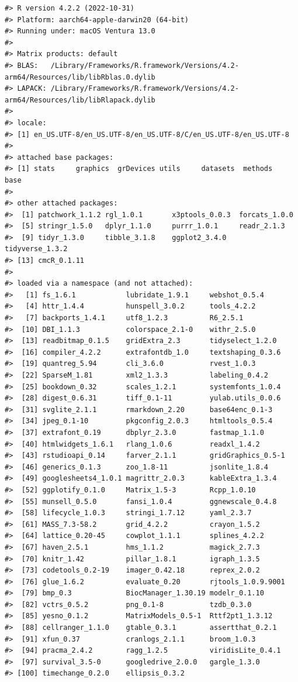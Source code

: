 \begin{verbatim}
#> R version 4.2.2 (2022-10-31)
#> Platform: aarch64-apple-darwin20 (64-bit)
#> Running under: macOS Ventura 13.0
#> 
#> Matrix products: default
#> BLAS:   /Library/Frameworks/R.framework/Versions/4.2-arm64/Resources/lib/libRblas.0.dylib
#> LAPACK: /Library/Frameworks/R.framework/Versions/4.2-arm64/Resources/lib/libRlapack.dylib
#> 
#> locale:
#> [1] en_US.UTF-8/en_US.UTF-8/en_US.UTF-8/C/en_US.UTF-8/en_US.UTF-8
#> 
#> attached base packages:
#> [1] stats     graphics  grDevices utils     datasets  methods   base     
#> 
#> other attached packages:
#>  [1] patchwork_1.1.2 rgl_1.0.1       x3ptools_0.0.3  forcats_1.0.0  
#>  [5] stringr_1.5.0   dplyr_1.1.0     purrr_1.0.1     readr_2.1.3    
#>  [9] tidyr_1.3.0     tibble_3.1.8    ggplot2_3.4.0   tidyverse_1.3.2
#> [13] cmcR_0.1.11    
#> 
#> loaded via a namespace (and not attached):
#>   [1] fs_1.6.1            lubridate_1.9.1     webshot_0.5.4      
#>   [4] httr_1.4.4          hunspell_3.0.2      tools_4.2.2        
#>   [7] backports_1.4.1     utf8_1.2.3          R6_2.5.1           
#>  [10] DBI_1.1.3           colorspace_2.1-0    withr_2.5.0        
#>  [13] readbitmap_0.1.5    gridExtra_2.3       tidyselect_1.2.0   
#>  [16] compiler_4.2.2      extrafontdb_1.0     textshaping_0.3.6  
#>  [19] quantreg_5.94       cli_3.6.0           rvest_1.0.3        
#>  [22] SparseM_1.81        xml2_1.3.3          labeling_0.4.2     
#>  [25] bookdown_0.32       scales_1.2.1        systemfonts_1.0.4  
#>  [28] digest_0.6.31       tiff_0.1-11         yulab.utils_0.0.6  
#>  [31] svglite_2.1.1       rmarkdown_2.20      base64enc_0.1-3    
#>  [34] jpeg_0.1-10         pkgconfig_2.0.3     htmltools_0.5.4    
#>  [37] extrafont_0.19      dbplyr_2.3.0        fastmap_1.1.0      
#>  [40] htmlwidgets_1.6.1   rlang_1.0.6         readxl_1.4.2       
#>  [43] rstudioapi_0.14     farver_2.1.1        gridGraphics_0.5-1 
#>  [46] generics_0.1.3      zoo_1.8-11          jsonlite_1.8.4     
#>  [49] googlesheets4_1.0.1 magrittr_2.0.3      kableExtra_1.3.4   
#>  [52] ggplotify_0.1.0     Matrix_1.5-3        Rcpp_1.0.10        
#>  [55] munsell_0.5.0       fansi_1.0.4         ggnewscale_0.4.8   
#>  [58] lifecycle_1.0.3     stringi_1.7.12      yaml_2.3.7         
#>  [61] MASS_7.3-58.2       grid_4.2.2          crayon_1.5.2       
#>  [64] lattice_0.20-45     cowplot_1.1.1       splines_4.2.2      
#>  [67] haven_2.5.1         hms_1.1.2           magick_2.7.3       
#>  [70] knitr_1.42          pillar_1.8.1        igraph_1.3.5       
#>  [73] codetools_0.2-19    imager_0.42.18      reprex_2.0.2       
#>  [76] glue_1.6.2          evaluate_0.20       rjtools_1.0.9.9001 
#>  [79] bmp_0.3             BiocManager_1.30.19 modelr_0.1.10      
#>  [82] vctrs_0.5.2         png_0.1-8           tzdb_0.3.0         
#>  [85] yesno_0.1.2         MatrixModels_0.5-1  Rttf2pt1_1.3.12    
#>  [88] cellranger_1.1.0    gtable_0.3.1        assertthat_0.2.1   
#>  [91] xfun_0.37           cranlogs_2.1.1      broom_1.0.3        
#>  [94] pracma_2.4.2        ragg_1.2.5          viridisLite_0.4.1  
#>  [97] survival_3.5-0      googledrive_2.0.0   gargle_1.3.0       
#> [100] timechange_0.2.0    ellipsis_0.3.2
\end{verbatim}

